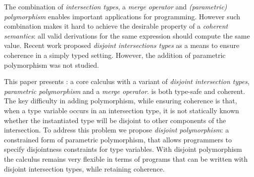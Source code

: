 The combination of \emph{intersection types}, a \emph{merge operator} 
and \emph{(parametric) polymorphism} enables
important applications for programming. However such combination makes
it hard to achieve the desirable property of a \emph{coherent
semantics}: all valid derivations for the same expression should
compute the same value. Recent work proposed \emph{disjoint
intersections types} as a means to ensure coherence in a simply typed
setting. However, the addition of parametric polymorphism was not
studied.

This paper presents \name: a core calculus with a variant of
\emph{disjoint intersection types}, \emph{parametric polymorphism} and a
\emph{merge operator}. \name is both type-safe and
coherent. The key difficulty in adding polymorphism, while ensuring
coherence is that, when a type variable occurs in an intersection
type, it is not statically known whether the instantiated type will be
disjoint to other components of the intersection. To address this
problem we propose \emph{disjoint polymorphism}: a constrained form of
parametric polymorphism, that allows programmers to specify
disjointness constraints for type variables. With disjoint
polymorphism the calculus remains very flexible in terms of programs
that can be written with disjoint intersection types, while retaining
coherence.

\begin{comment}
Coherence is achieved by ensuring that intersection types
are \emph{disjoint}. The approach works in the presence of parametric
polymorphism. However, parametric polymorphism makes the problem of coherence
significantly harder. When a type variable occurs in an intersection
type, it is not statically known whether the instantiated type will
be disjoint to other components of the intersection.
To address this problem we propose \emph{disjoint polymorphism}: a
constrained form of parametric polymorphism, that allows programmers
to specify disjointness constraints for type variables. With disjoint
polymorphism the calculus remains very flexible in terms of programs
that can be written with intersection types, while retaining coherence.
\end{comment}